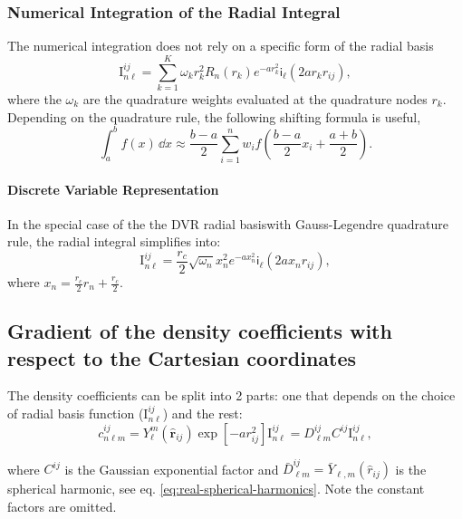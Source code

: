 \documentclass[
journal=jctcce, %
manuscript=article, layout=onecolumn]{achemso}
\begin{document}
\subsubsection{Numerical Integration of the Radial Integral}

The numerical integration does not rely on a specific form of the radial basis
\begin{equation}
    \text{I}_{n\ell}^{ij} = \sum_{k=1}^{K} \omega_k  r_k^2 R_n(r_k) e^{-ar_k^2} \mathsf{i}_{\ell}\left(2a r_k r_{ij}\right),
\end{equation}
where the $\omega_k$ are the quadrature weights evaluated at the quadrature nodes $r_k$. Depending on the quadrature rule, the following shifting formula is useful,
$$\int_a^b f(x)\,\dd{x} \approx \frac{b-a}{2} \sum_{i=1}^n w_i f\left(\frac{b-a}{2}x_i + \frac{a+b}{2}\right).$$

\paragraph{Discrete Variable Representation}

In the special case of the the DVR radial basis\footnotemark[1] with Gauss-Legendre quadrature rule, the radial integral simplifies into:
\begin{equation}
    \text{I}_{n\ell}^{ij} = \frac{r_c}{2} \sqrt{\omega_n} x_n^2 e^{-ax_n^2} \mathsf{i}_{\ell}\left(2a x_n r_{ij}\right),
\end{equation}
where $x_n=\frac{r_c}{2}r_n+\frac{r_c}{2}$.


\subsection{Gradient of the density coefficients with respect to the Cartesian coordinates}
The density coefficients can be split into 2 parts: one that depends on the choice of radial basis function ($\text{I}_{n\ell}^{ij}$) and the rest:
\begin{equation}
c^{ij}_{n\ell m} =  Y_{\ell}^m(\hat{\mathbf{r}}_{ij}) \exp\left[-ar^2_{ij}\right] \text{I}_{n\ell}^{ij} =  D^{ij}_{\ell m} C^{ij} \text{I}_{n\ell}^{ij},
\end{equation}

where $C^{ij}$ is the Gaussian exponential factor and $\bar{D}^{ij}_{\ell m} = \bar{Y}_{\ell,m}(\hat{r}_{ij})$ is the spherical harmonic, see eq. \eqref{eq:real-spherical-harmonics}. Note the constant factors are omitted.
\end{document}
